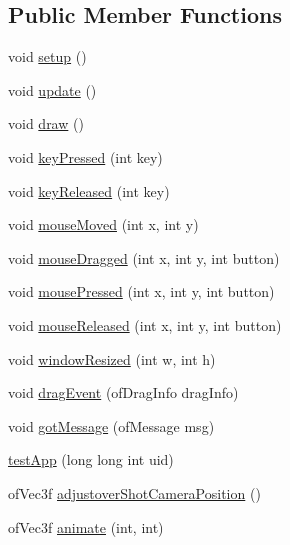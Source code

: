 \subsection*{Public Member Functions}
\begin{DoxyCompactItemize}
\item 
void \hyperlink{group___openframeworks_defaults_gad431db15b6150b965cd52bcba8e16e11}{setup} ()
\item 
void \hyperlink{group___openframeworks_defaults_gafb39d201aec71a295b7609876bf7d0c6}{update} ()
\item 
void \hyperlink{group___openframeworks_defaults_gaf869cba67b1dab8481f8d0e216d59dcd}{draw} ()
\item 
void \hyperlink{group___openframeworks_defaults_ga904d147c7e532cb92656d5dd4895cd26}{key\-Pressed} (int key)
\item 
void \hyperlink{group___openframeworks_defaults_ga1116a10088e4932f6d482efe723cd45e}{key\-Released} (int key)
\item 
void \hyperlink{group___openframeworks_defaults_ga33541b19eff9f8285b2487bfc146d58b}{mouse\-Moved} (int x, int y)
\item 
void \hyperlink{group___openframeworks_defaults_ga075bcc2be16fd8f3eaa9162fb40a0a1f}{mouse\-Dragged} (int x, int y, int button)
\item 
void \hyperlink{group___openframeworks_defaults_ga3f200702ce91859cac2872a39302679d}{mouse\-Pressed} (int x, int y, int button)
\item 
void \hyperlink{group___openframeworks_defaults_gaa3680ffc782b1e5c451289817f20c9c6}{mouse\-Released} (int x, int y, int button)
\item 
void \hyperlink{group___openframeworks_defaults_ga428b7df9c64352d6e7cb234fc297e6c9}{window\-Resized} (int w, int h)
\item 
void \hyperlink{group___openframeworks_defaults_gaf15e9e9064fe5ccbe6c82cc401ae9e09}{drag\-Event} (of\-Drag\-Info drag\-Info)
\item 
void \hyperlink{group___openframeworks_defaults_ga66dbc8c5c2d4e20febebe9fd42b8c851}{got\-Message} (of\-Message msg)
\item 
\hyperlink{classtest_app_ad4619d5025758886b4de4162c389dc7a}{test\-App} (long long int uid)
\item 
of\-Vec3f \hyperlink{group___camera_ga2a792bfdf269fd69951cbf97d4f574af}{adjustover\-Shot\-Camera\-Position} ()
\item 
of\-Vec3f \hyperlink{group___camera_ga1facfe2200dae7ad147b8f9ab31f68c6}{animate} (int, int)

\end{DoxyCompactItemize}
